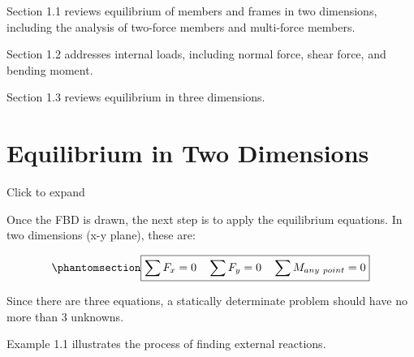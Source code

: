 \documentclass[
  letterpaper,
  DIV=11,
  numbers=noendperiod]{scrreprt}
\theoremstyle{definition}
\theoremstyle{remark}
\begin{document}
Section 1.1 reviews equilibrium of members and frames in two dimensions,
including the analysis of two-force members and multi-force members.

Section 1.2 addresses internal loads, including normal force, shear
force, and bending moment.

Section 1.3 reviews equilibrium in three dimensions.

\section{Equilibrium in Two Dimensions}\label{sec-1.1}

Click to expand

Once the FBD is drawn, the next step is to apply the equilibrium
equations. In two dimensions (x-y plane), these are:

\begin{equation}\phantomsection\label{eq-1.1}{
\boxed{\sum F_x=0 \quad \sum F_y=0 \quad \sum M_{any~point}=0}
}\end{equation}

Since there are three equations, a statically determinate problem should
have no more than 3 unknowns.

Example 1.1 illustrates the process of finding external reactions.
\end{document}
